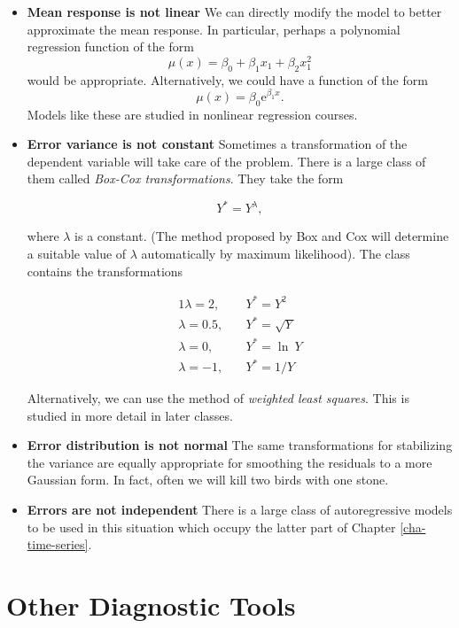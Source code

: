\documentclass[]{book}
\providecommand{\tightlist}{%
  \setlength{\itemsep}{0pt}\setlength{\parskip}{0pt}}
\numberwithin{equation}{chapter}
\numberwithin{figure}{chapter}
\theoremstyle{plain}
\theoremstyle{definition}
\theoremstyle{remark}
\theoremstyle{definition}
\theoremstyle{definition}
\theoremstyle{remark}
\begin{document}
\begin{itemize}
\tightlist
\item
  \textbf{Mean response is not linear} We can directly modify the model
  to better approximate the mean response. In particular, perhaps a
  polynomial regression function of the form \[ \mu(x) =
   \beta_{0} + \beta_{1}x_{1} + \beta_{2}x_{1}^{2} \] would be
  appropriate. Alternatively, we could have a function of the form
  \[ \mu(x)=\beta_{0}\mathrm{e}^{\beta_{1}x}.  \] Models like these are
  studied in nonlinear regression courses.
\item
  \textbf{Error variance is not constant} Sometimes a transformation of
  the dependent variable will take care of the problem. There is a large
  class of them called \emph{Box-Cox transformations}. They take the
  form

  \begin{equation}
   Y^{\ast}=Y^{\lambda},
   \end{equation}

  where \(\lambda\) is a constant. (The method proposed by Box and Cox
  will determine a suitable value of \(\lambda\) automatically by
  maximum likelihood). The class contains the transformations

  \begin{alignat*}{1} \lambda=2,\quad &
   Y^{\ast}=Y^{2}\\ \lambda=0.5,\quad &
   Y^{\ast}=\sqrt{Y}\\ \lambda=0,\quad & Y^{\ast}=\ln\:
   Y\\ \lambda=-1,\quad & Y^{\ast}= 1/Y \end{alignat*}

  Alternatively, we can use the method of \emph{weighted least squares}.
  This is studied in more detail in later classes.
\item
  \textbf{Error distribution is not normal} The same transformations for
  stabilizing the variance are equally appropriate for smoothing the
  residuals to a more Gaussian form. In fact, often we will kill two
  birds with one stone.
\item
  \textbf{Errors are not independent} There is a large class of
  autoregressive models to be used in this situation which occupy the
  latter part of Chapter \ref{cha-time-series}.
\end{itemize}

\section{Other Diagnostic Tools}\label{sec-other-diagnostic-tools-slr}
\end{document}
